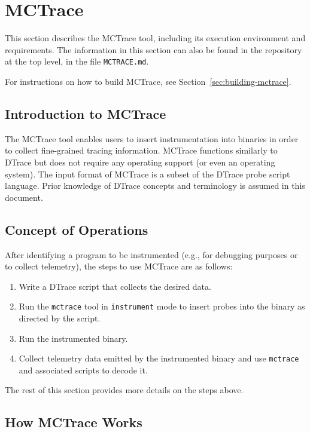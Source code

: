 
\section{MCTrace}
\label{sec:mctrace}

This section describes the MCTrace tool, including its execution
environment and requirements.  The information in this section can also
be found in the repository at the top level, in the file
\texttt{MCTRACE.md}.

For instructions on how to build MCTrace, see
Section~\ref{sec:building-mctrace}. 

\subsection{Introduction to MCTrace}
\label{sec:introduction-mctrace}

The MCTrace tool enables users to insert instrumentation into binaries
in order to collect fine-grained tracing information. MCTrace functions
similarly to DTrace but does not require any operating support (or even
an operating system). The input format of MCTrace is a subset of the
DTrace probe script language. Prior knowledge of DTrace concepts and
terminology is assumed in this document.

\subsection{Concept of Operations}
\label{sec:concept-operations}

After identifying a program to be instrumented (e.g., for debugging
purposes or to collect telemetry), the steps to use MCTrace are as
follows:
\begin{enumerate}
\item  Write a DTrace script that collects the desired data. 
\item Run the \texttt{mctrace} tool in \texttt{instrument} mode to insert probes into the
   binary as directed by the script.
\item  Run the instrumented binary.
\item Collect telemetry data emitted by the instrumented binary and use
   \texttt{mctrace} and associated scripts to decode it.
\end{enumerate}

The rest of this section provides more details on the steps above.

\subsection{How MCTrace Works}
\label{sec:how-mctrace-works}


